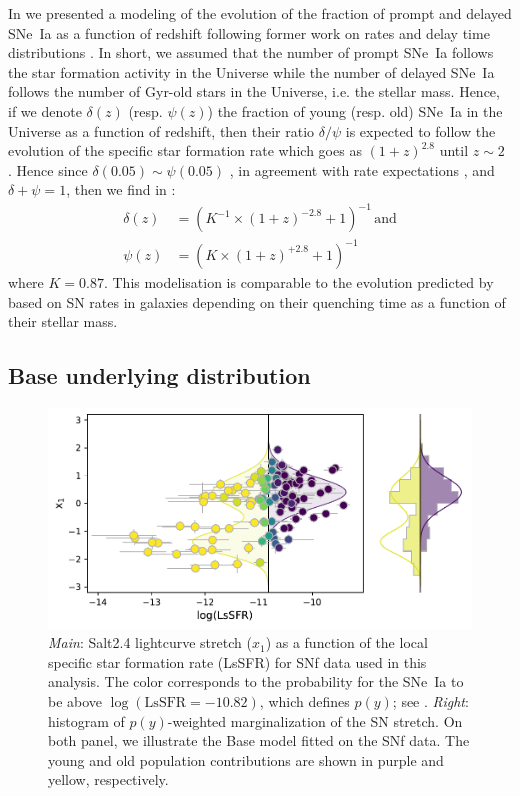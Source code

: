 \documentclass[]{aa} %
\newcommand{\nn}[1]{{\textcolor[rgb]{1, 0.27, 0}{#1}}}
\begin{document}
In \cite{rigault2018} we presented a modeling of the evolution of the fraction
of prompt and delayed SNe~Ia as a function of redshift following former work on
rates and delay time distributions \citep[e.g.,][]{mannucci2005,
scannapieco2005, sullivan2006, aubourg2008, childress2014, maozmannucci2014}.
In short, we assumed that the number of prompt SNe~Ia follows the star formation
activity in the Universe while the number of delayed SNe~Ia follows the number
of Gyr-old stars in the Universe, i.e. the stellar mass. Hence, if we denote
$\delta(z)$ (resp. $\psi(z)$) the fraction of young (resp. old) SNe~Ia in the
Universe as a function of redshift, then their ratio $\delta/\psi$ is expected
to follow the evolution of the specific star formation rate which goes as
$(1+z)^{2.8}$ until $z\sim2$ \citep[e.g.,][]{tasca2015}. Hence since
\nn{$\delta(0.05) \sim \psi(0.05)$} \citep{rigault2013,rigault2018,wiseman2020},
in agreement with rate expectations \citep{mannucci2006,rodney2014}, \nn{and
$\delta + \psi = 1$,} then we find in \cite{rigault2018}:
\begin{align}
    \label{eq:delta}
    \delta(z) & = \left( K^{-1} \times (1+z)^{-2.8} +1 \right)^{-1}\,
    \mathrm{and}\\
    \psi(z) & = \left( K \times (1+z)^{+2.8} +1 \right)^{-1}
\end{align}
where $K=0.87$. This modelisation is comparable to the evolution predicted by
\cite{childress2014} based on SN rates in galaxies depending on their quenching
time as a function of their stellar mass.

\subsection{\nn{Base underlying distribution}}
\label{sec:basemodel}

\begin{figure}
    \centering
    \includegraphics[width=0.8\linewidth]{Article_figures/model_base_hist.pdf}
    \caption{\textit{Main}: Salt2.4 lightcurve stretch ($x_1$) as a function of
        the local specific star formation rate (LsSFR) for SNf data used in this
        analysis. The color corresponds to the probability for the SNe~Ia to be
        above $\log(\mathrm{LsSFR}=-10.82)$, which defines $p(y)$; see
        \cite{rigault2018}. \textit{Right}: histogram of $p(y)$-weighted
        marginalization of the SN stretch.  On both panel, we illustrate the
        Base model fitted on the SNf data. The young and old population
        contributions are shown in purple and yellow, respectively.}
    \label{fig:stretchlssfr}
\end{figure}
\end{document}
